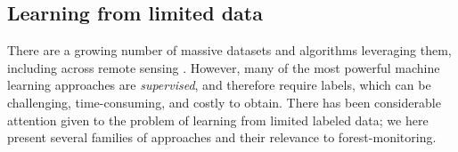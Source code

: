 \documentclass{CUP-JNL-DTM}%
\theoremstyle{definition}
\numberwithin{equation}{section}
\begin{document}
\subsection{Learning from limited data}
\label{sec:ml_limited_data}

There are a growing number of massive datasets and algorithms leveraging them, including across remote sensing \cite{bastani_satlas_2022, sumbul_bigearthnet-mm_2021,rahaman_general_2022, mai_opportunities_2023}. 
However, many of the most powerful machine learning approaches are \emph{supervised}, and therefore require labels, which can be challenging, time-consuming, and costly to obtain.
There has been considerable attention given to the problem of learning from limited labeled data; we here present several families of approaches and their relevance to forest-monitoring.
\end{document}
